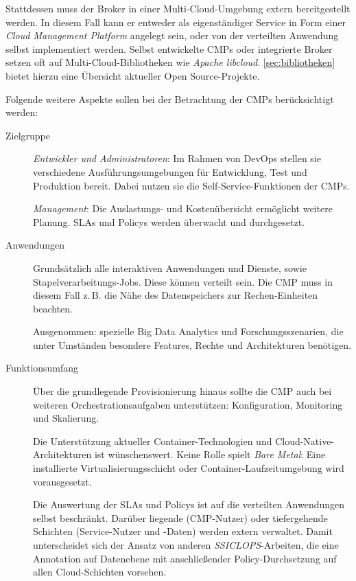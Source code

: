 Stattdessen muss der Broker in einer Multi-Cloud-Umgebung extern bereitgestellt werden. In diesem Fall kann er entweder als eigenständiger Service in Form einer \emph{Cloud Management Platform} angelegt sein, oder von der verteilten Anwendung selbst implementiert werden. Selbst entwickelte CMPs oder integrierte Broker setzen oft auf Multi-Cloud-Bibliotheken wie \emph{Apache libcloud}. \autoref{sec:bibliotheken} bietet hierzu eine Übersicht aktueller Open Source-Projekte. 

Folgende weitere Aspekte sollen bei der Betrachtung der CMPs berücksichtigt werden:

\begin{description}
	
	\item[Zielgruppe] 	\emph{Entwickler und Administratoren}: Im Rahmen von DevOps stellen sie verschiedene Ausführungsumgebungen für Entwicklung, Test und Produktion bereit. Dabei nutzen sie die Self-Service-Funktionen der CMPs.
	
						\emph{Management}: Die Auslastungs- und Kostenübersicht ermöglicht weitere Planung. SLAs und Policys werden überwacht und durchgesetzt.
	
	\item[Anwendungen] Grundsätzlich alle interaktiven Anwendungen und Dienste, sowie Stapelverarbeitungs-Jobs. Diese können verteilt sein. Die CMP muss in diesem Fall z.\,B. die Nähe des Datenspeichers zur Rechen-Einheiten beachten.
	
	Ausgenommen: spezielle Big Data Analytics und Forschungsszenarien, die unter Umständen besondere Features, Rechte und Architekturen benötigen.
	
	\item[Funktionsumfang] Über die grundlegende Provisionierung hinaus sollte die CMP auch bei weiteren Orchestrationsaufgaben unterstützen: Konfiguration, Monitoring und Skalierung.
	
	Die Unterstützung aktueller Container-Technologien und Cloud-Native-Architekturen ist wünschenswert. Keine Rolle spielt \emph{Bare Metal}: Eine installierte Virtualisierungsschicht oder Container-Laufzeitumgebung wird vorausgesetzt. 
	
	Die Auswertung der SLAs und Policys ist auf die verteilten Anwendungen selbst beschränkt. Darüber liegende (CMP-Nutzer) oder tiefergehende Schichten (Service-Nutzer und -Daten) werden extern verwaltet. Damit unterscheidet sich der Ansatz von anderen \emph{SSICLOPS}-Arbeiten, die eine Annotation auf Datenebene mit anschließender Policy-Durchsetzung auf allen Cloud-Schichten vorsehen.	
		
\end{description}

